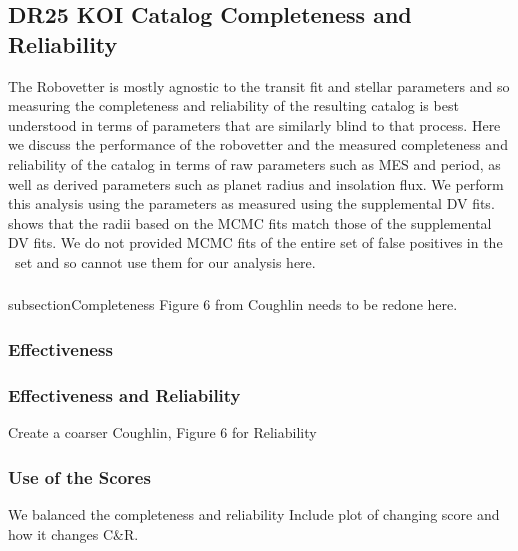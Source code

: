 \subsection{DR25 KOI Catalog Completeness and Reliability}
The Robovetter is mostly agnostic to the transit fit and stellar parameters and so measuring the completeness and reliability of the resulting catalog is best understood in terms of parameters that are similarly blind to that process.  Here we discuss the performance of the robovetter and the measured completeness and reliability of the catalog in terms of raw parameters such as MES and period, as well as derived parameters such as planet radius and insolation flux.  We perform this analysis using the parameters as measured using the supplemental DV fits.  \citet{Christiansen2017} shows that the radii based on the MCMC fits match those of the supplemental DV fits. We do not provided MCMC fits of the entire set of false positives in the \opstce\ set and so cannot use them for our analysis here.

\subsubsection{}subsection{Completeness}
Figure 6 from Coughlin needs to be redone here.



\subsubsection{Effectiveness}

\subsubsection{Effectiveness and Reliability}
Create a coarser Coughlin, Figure 6 for Reliability 

\subsubsection{Use of the Scores}
We balanced the completeness and reliability
Include plot of changing score and how it changes C&R.

